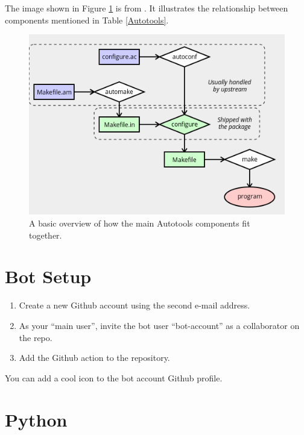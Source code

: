 \justifying
The image shown in Figure \ref{diagram} is from \cite{autobasics}.
It illustrates the relationship between components mentioned in Table \ref{Autotools}.
\vspace{2mm}

\begin{figure}[ht]
	\includegraphics[width=12cm]{images/diagram.png}
	\caption{A basic overview of how the main Autotools components fit together.}
	\label{diagram}
\end{figure}
\vspace{2mm}

\section{\label{sec:bot}Bot Setup}


\justifying
\begin{raggedright}
	\begin{enumerate}
		\item Create a new Github account using the second e-mail address.
		\item As your ``main user'', invite the bot user ``bot-account'' as a collaborator on the repo.
		\item Add the Github action to the repository.
	\end{enumerate}
\end{raggedright}
\vspace{2mm}

\justifying
You can add a cool icon to the bot account Github profile.


\section{\label{sec:Python}Python}

